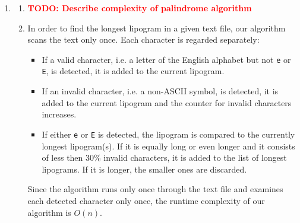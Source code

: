 \documentclass[a4paper,11pt,oneside]{book}
\newcommand{\todo}[1]{\textcolor{red}{\textbf{TODO: #1}}}
\begin{document}
\begin{enumerate}
	\item	\begin{enumerate}
					\item \todo{Describe complexity of palindrome algorithm}
					\item In order to find the longest lipogram in a given text file, our algorithm scans the text only once. Each character is regarded separately: \begin{itemize}
							\item If a valid character, i.e. a letter of the English alphabet but not \texttt{e} or \texttt{E}, is detected, it is added to the current lipogram.
							\item If an invalid character, i.e. a non-ASCII symbol, is detected, it is added to the current lipogram and the counter for invalid characters increases.
							\item If either \texttt{e} or \texttt{E} is detected, the lipogram is compared to the currently longest lipogram(s). If it is equally long or even longer and it consists of less then 30\% invalid characters, it is added to the list of longest lipograms. If it is longer, the smaller ones are discarded.
						\end{itemize}
						Since the algorithm runs only once through the text file and examines each detected character only once, the runtime complexity of our algorithm is $O(n)$.
				\end{enumerate}
\end{enumerate}

\end{document}
